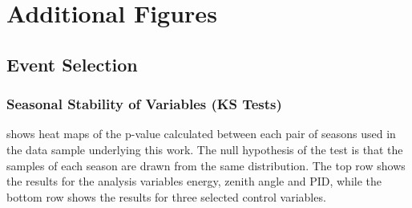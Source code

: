 \chapter{Additional Figures}
\label{ch:additional-figures}

\section{Event Selection}

\subsection{Seasonal Stability of Variables (KS Tests)}
\label{sec:ks-test-appendix}

 shows heat maps of the p-value calculated between each pair of seasons used in the data sample underlying this work. The null hypothesis of the test is that the samples of each season are drawn from the same distribution. The top row shows the results for the analysis variables energy, zenith angle and PID, while the bottom row shows the results for three selected control variables. 

